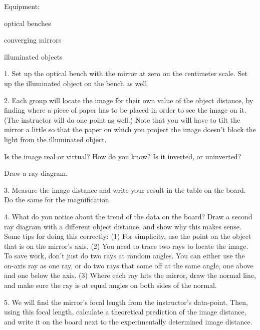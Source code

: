\noindent Equipment:

\begin{indentedblock}
	optical benches

	converging mirrors

	illuminated objects
\end{indentedblock}

1. Set up the optical bench with the mirror at zero on the
centimeter scale. Set up the illuminated object on the bench as well.

2.  Each group will locate the image for their own value of
the object distance, by finding where a piece of paper has
to be placed in order to see the image on it. (The
instructor will do one point as well.) Note that you will
have to tilt the mirror a little so that the paper on which
you project the image doesn't block the light from
the illuminated object.

Is the image real or virtual? How do you know? Is it
inverted, or uninverted? 

Draw a ray diagram.
\vspace{70mm}


3. Measure the image distance and write your result in the
table on the board. Do the same for the magnification.

4. What do you notice about the trend of the data on the
board? Draw a second ray diagram with a different object
distance, and show why this makes sense. Some tips for doing
this correctly: (1) For simplicity, use the point on the
object that is on the mirror's axis. (2) You need to trace
two rays to locate the image. To save work, don't just do
two rays at random angles. You can either use the on-axis
ray as one ray, or do two rays that come off at the same
angle, one above and one below the axis. (3) Where each ray
hits the mirror, draw the normal line, and make sure the ray
is at equal angles on both sides of the normal.

5. We will find the mirror's focal length from the
instructor's data-point. Then, using this focal length,
calculate a theoretical prediction of the image distance,
and write it on the board next to the experimentally
determined image distance.
